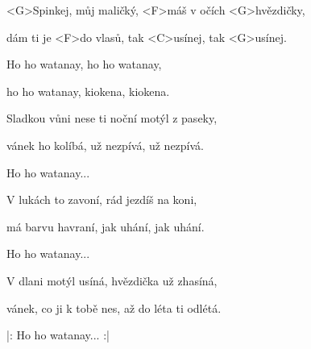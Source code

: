 

\zs
<G>Spinkej, můj maličký, <F>máš v očích <G>hvězdičky,

dám ti je <F>do vlasů, tak <C>usínej, tak <G>usínej.
\ks

\zr
Ho ho watanay, ho ho watanay,

ho ho watanay, kiokena, kiokena.
\kr

\zs
Sladkou vůni nese ti noční motýl z paseky,

vánek ho kolíbá, už nezpívá, už nezpívá.
\ks

\zr
Ho ho watanay...
\kr

\zs
V lukách to zavoní, rád jezdíš na koni,

má barvu havraní, jak uhání, jak uhání.
\ks

\zr
Ho ho watanay...
\kr

\zs
V dlani motýl usíná, hvězdička už zhasíná,

vánek, co ji k tobě nes, až do léta ti odlétá.
\ks

\zr
|: Ho ho watanay... :|
\kr

\kp
